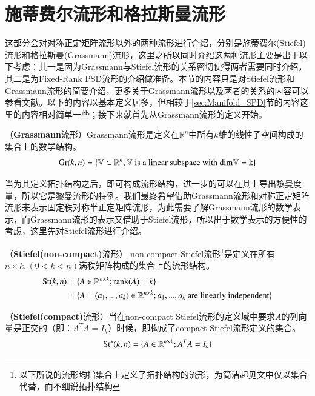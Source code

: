 \section{施蒂费尔流形和格拉斯曼流形}
\label{sec:Grassmann_Manifold}
这部分会对对称正定矩阵流形以外的两种流形进行介绍，分别是施蒂费尔(Stiefel)流形和格拉斯曼(Grassmann)流形，这里之所以同时介绍这两种流形主要是出于以下考虑：其一是因为Grassmann与Stiefel流形的关系密切使得两者需要同时介绍，其二是为Fixed-Rank PSD流形的介绍做准备。本节的内容只是对Stiefel流形和Grassmann流形的简要介绍，更多关于Grassmann流形以及两者的关系的内容可以参看文献\cite{Grassmann}。以下的内容以基本定义居多，但相较于\ref{sec:Manifold_SPD}节的内容这里的内容相对简单一些；接下来就首先从Grassmann流形的定义开始。
\begin{definition}
\label{Grassmann_def}
{\heiti （\textbf{Grassmann}流形）}Grassmann流形是定义在$\mathbb{R}^n$中所有$k$维的线性子空间构成的集合上的数学结构。
\begin{equation}
{\rm Gr}(k,n)=\{\mathbb{V} \subset \mathbb{R}^n,\mathbb{V}\text{ is a linear subspace with }\rm{dim}\mathbb{V}=k\}
\end{equation}
\end{definition}
当为其定义拓扑结构之后，即可构成流形结构，进一步的可以在其上导出黎曼度量\cite{Grassmann}，所以它是黎曼流形的特例。我们最终希望借助Grassmann流形和对称正定矩阵流形来表示固定秩对称半正定矩阵流形，为此需要了解Grassmann流形的数学表示，而Grassmann流形的表示又借助于Stiefel流形，所以出于数学表示的方便性的考虑，这里先对Stiefel流形进行介绍。
\begin{definition}
\label{Stiefel_nonCompact_def}
{\heiti （\textbf{Stiefel(non-compact)}流形）} non-compact Stiefel流形\footnote{以下所说的流形均指集合上定义了拓扑结构的流形，为简洁起见文中仅以集合代替，而不细说拓扑结构}是定义在所有$n\times k,(0<k<n)$满秩矩阵构成的集合上的流形结构。
\begin{equation}
\begin{split}
{\rm St}(k,n)&=\{A \in \mathbb{R}^{n\times k};{\rm rank}(A)=k\}\\
&=\{A=(a_1,...,a_k)\in \mathbb{R}^{n\times k}; a_1,...,a_k \text{ are linearly independent}\}
\end{split}
\end{equation}
\end{definition}
\begin{definition}
\label{Stiefel_Compact_def}
{\heiti （\textbf{Stiefel(compact)}流形）}当在non-compact Stiefel流形\footnotemark[\value{footnote}]的定义域中要求$A$的列向量是正交的（即：$A^{T}A=I_k$）时候，即构成了compact Stiefel流形定义的集合。
\begin{equation}
{\rm St}^{*}(k,n)=\{A\in\mathbb{R}^{n\times k};A^{T}A=I_k\}
\end{equation}
\end{definition}
